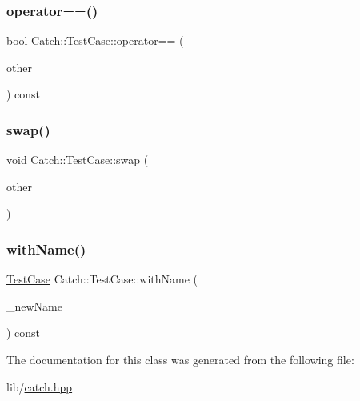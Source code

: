 \subsubsection{\texorpdfstring{operator==()}{operator==()}}
{\footnotesize\ttfamily bool Catch\+::\+Test\+Case\+::operator== (\begin{DoxyParamCaption}\item[{\hyperlink{class_catch_1_1_test_case}{Test\+Case} const \&}]{other }\end{DoxyParamCaption}) const}

\hypertarget{class_catch_1_1_test_case_aee38f908faf10b905b209ca388275413}{}\label{class_catch_1_1_test_case_aee38f908faf10b905b209ca388275413} 
\subsubsection{\texorpdfstring{swap()}{swap()}}
{\footnotesize\ttfamily void Catch\+::\+Test\+Case\+::swap (\begin{DoxyParamCaption}\item[{\hyperlink{class_catch_1_1_test_case}{Test\+Case} \&}]{other }\end{DoxyParamCaption})}

\hypertarget{class_catch_1_1_test_case_a0812e8a216d09b087d5874687009f0d6}{}\label{class_catch_1_1_test_case_a0812e8a216d09b087d5874687009f0d6} 
\subsubsection{\texorpdfstring{with\+Name()}{withName()}}
{\footnotesize\ttfamily \hyperlink{class_catch_1_1_test_case}{Test\+Case} Catch\+::\+Test\+Case\+::with\+Name (\begin{DoxyParamCaption}\item[{std\+::string const \&}]{\+\_\+new\+Name }\end{DoxyParamCaption}) const}



The documentation for this class was generated from the following file\+:\begin{DoxyCompactItemize}
\item 
lib/\hyperlink{catch_8hpp}{catch.\+hpp}\end{DoxyCompactItemize}
